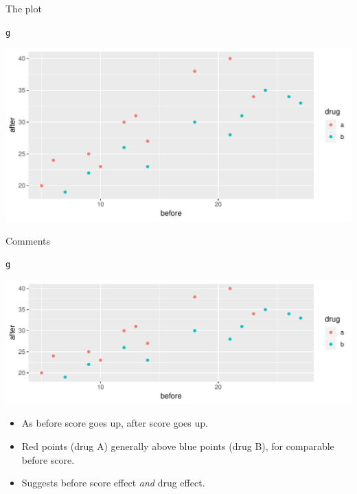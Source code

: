 \documentclass[unknownkeysallowed]{beamer}\usepackage[]{graphicx}\usepackage[]{color}
\makeatletter
\def\maxwidth{ %
  \ifdim\Gin@nat@width>\linewidth
    \linewidth
  \else
    \Gin@nat@width
  \fi
}
\newcommand{\hlstd}[1]{\textcolor[rgb]{0.345,0.345,0.345}{#1}}%
\newenvironment{kframe}{%
 \def\at@end@of@kframe{}%
 \ifinner\ifhmode%
  \def\at@end@of@kframe{\end{minipage}}%
  \begin{minipage}{\columnwidth}%
 \fi\fi%
 \def\FrameCommand##1{\hskip\@totalleftmargin \hskip-\fboxsep
 \colorbox{shadecolor}{##1}\hskip-\fboxsep
     \hskip-\linewidth \hskip-\@totalleftmargin \hskip\columnwidth}%
 \MakeFramed {\advance\hsize-\width
   \@totalleftmargin\z@ \linewidth\hsize
   \@setminipage}}%
 {\par\unskip\endMakeFramed%
 \at@end@of@kframe}
\newenvironment{knitrout}{}{} %
\makeatother
\begin{document}
\begin{frame}{The plot}

 
\begin{knitrout}
\color{fgcolor}\begin{kframe}
\begin{alltt}
\hlstd{g}
\end{alltt}
\end{kframe}
\includegraphics[width=\maxwidth]{figure/spizzo-1} 

\end{knitrout}
  
  
\end{frame}

\begin{frame}[fragile]{Comments}

\begin{knitrout}
\color{fgcolor}\begin{kframe}
\begin{alltt}
\hlstd{g}
\end{alltt}
\end{kframe}
\includegraphics[width=\maxwidth]{figure/unnamed-chunk-211-1} 

\end{knitrout}

\begin{itemize}
\item As before score goes up, after score goes up.
\item Red points (drug A) generally above blue points (drug B), for
  comparable before score.
\item Suggests before score effect \emph{and} drug effect.
\end{itemize}
  
\end{frame}
\end{document}

